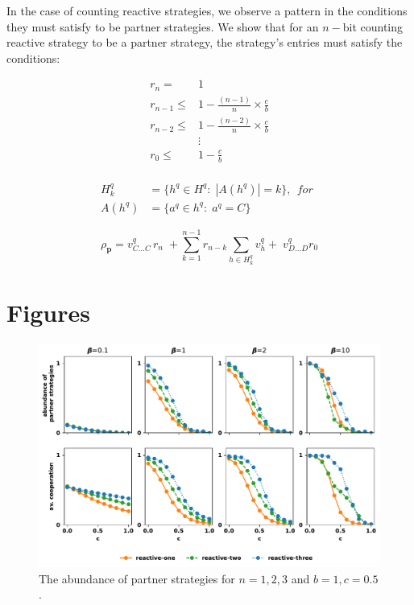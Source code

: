 \documentclass{article}
\theoremstyle{definition}
\begin{document}
In the case of counting reactive strategies, we observe a pattern in the
conditions they must satisfy to be partner strategies. We show that for an $n-$bit
counting reactive strategy to be a partner strategy, the strategy's entries must
satisfy the conditions:

\begin{align*}
    r_{n}   = & 1 \\
    r_{n-1} \leq & 1  - \frac{(n - 1)}{n} \times \frac{c}{b}\\
    r_{n-2} \leq & 1  - \frac{(n - 2)}{n} \times \frac{c}{b}\\
    & \vdots \\
    r_{0} \leq &  1  - \frac{c}{b}\\
\end{align*}


\begin{align*}
  H^{q}_{k} & = \{h^q \in H^q : \; |A(h^q)| =k\}, ~~for~~ \\
  A(h^q) & = \{a^q \in h^q:  \; a^q = C\}
\end{align*}

\begin{equation}
  \rho_\mathbf{p} = v^q_{C \dots C}\, r_n  \; + \sum_{k=1}^{n-1} r_{n -k}  \sum_{h \in H^q_k} v^q_h + \; v^q_{D \dots D} r_0 
\end{equation}



\section{Figures}


\begin{figure}[!htbp]
  \includegraphics[width=\textwidth]{figures/abundance_of_partner_strategies.pdf}
  \caption{The abundance of partner strategies for $n=1,2,3$ and $b=1, c=0.5$.}
\end{figure}
\end{document}
